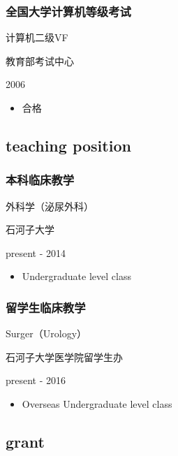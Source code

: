 \documentclass[]{article}
\providecommand{\tightlist}{%
  \setlength{\itemsep}{0pt}\setlength{\parskip}{0pt}}
\begin{document}
\hypertarget{ux5168ux56fdux5927ux5b66ux8ba1ux7b97ux673aux7b49ux7ea7ux8003ux8bd5}{%
\subsubsection{全国大学计算机等级考试}\label{ux5168ux56fdux5927ux5b66ux8ba1ux7b97ux673aux7b49ux7ea7ux8003ux8bd5}}

计算机二级VF

教育部考试中心

2006

\begin{itemize}
\tightlist
\item
  合格
\end{itemize}

\hypertarget{teaching-position}{%
\subsection{teaching position}\label{teaching-position}}

\hypertarget{ux672cux79d1ux4e34ux5e8aux6559ux5b66}{%
\subsubsection{本科临床教学}\label{ux672cux79d1ux4e34ux5e8aux6559ux5b66}}

外科学（泌尿外科）

石河子大学

present - 2014

\begin{itemize}
\tightlist
\item
  Undergraduate level class
\end{itemize}

\hypertarget{ux7559ux5b66ux751fux4e34ux5e8aux6559ux5b66}{%
\subsubsection{留学生临床教学}\label{ux7559ux5b66ux751fux4e34ux5e8aux6559ux5b66}}

Surger（Urology）

石河子大学医学院留学生办

present - 2016

\begin{itemize}
\tightlist
\item
  Overseas Undergraduate level class
\end{itemize}

\hypertarget{grant}{%
\subsection{grant}\label{grant}}
\end{document}
